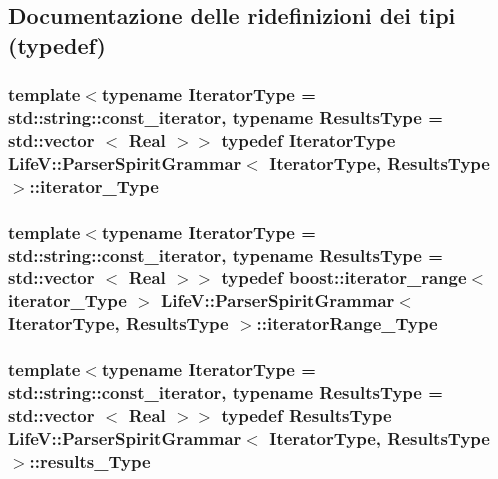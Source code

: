 \subsection{Documentazione delle ridefinizioni dei tipi (typedef)}
\hypertarget{classLifeV_1_1ParserSpiritGrammar_aaa28e2ed8f68d686da1e0bcc5834ed3b}{
\subsubsection[{iterator\-\_\-\-Type}]{\setlength{\rightskip}{0pt plus 5cm}template$<$typename Iterator\-Type = std\-::string\-::const\-\_\-iterator, typename Results\-Type = std\-::vector $<$ Real $>$$>$ typedef Iterator\-Type {\bf Life\-V\-::\-Parser\-Spirit\-Grammar}$<$ Iterator\-Type, Results\-Type $>$\-::{\bf iterator\-\_\-\-Type}}}\label{classLifeV_1_1ParserSpiritGrammar_aaa28e2ed8f68d686da1e0bcc5834ed3b}
\hypertarget{classLifeV_1_1ParserSpiritGrammar_a8aca47ceac2876986dbc2ff9ee4d2edd}{
\subsubsection[{iterator\-Range\-\_\-\-Type}]{\setlength{\rightskip}{0pt plus 5cm}template$<$typename Iterator\-Type = std\-::string\-::const\-\_\-iterator, typename Results\-Type = std\-::vector $<$ Real $>$$>$ typedef boost\-::iterator\-\_\-range$<$ {\bf iterator\-\_\-\-Type} $>$ {\bf Life\-V\-::\-Parser\-Spirit\-Grammar}$<$ Iterator\-Type, Results\-Type $>$\-::{\bf iterator\-Range\-\_\-\-Type}}}\label{classLifeV_1_1ParserSpiritGrammar_a8aca47ceac2876986dbc2ff9ee4d2edd}
\hypertarget{classLifeV_1_1ParserSpiritGrammar_a98dabec1a4a9a743a1d3b35e994cec7c}{
\subsubsection[{results\-\_\-\-Type}]{\setlength{\rightskip}{0pt plus 5cm}template$<$typename Iterator\-Type = std\-::string\-::const\-\_\-iterator, typename Results\-Type = std\-::vector $<$ Real $>$$>$ typedef Results\-Type {\bf Life\-V\-::\-Parser\-Spirit\-Grammar}$<$ Iterator\-Type, Results\-Type $>$\-::{\bf results\-\_\-\-Type}}}\label{classLifeV_1_1ParserSpiritGrammar_a98dabec1a4a9a743a1d3b35e994cec7c}


